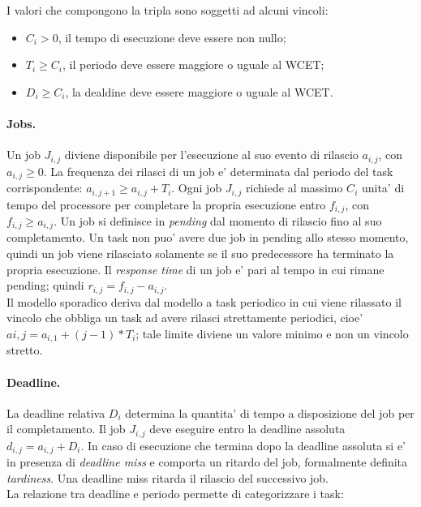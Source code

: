 I valori che compongono la tripla sono soggetti ad alcuni vincoli:\\

\begin{itemize}
	\item $C_i > 0$, il tempo di esecuzione deve essere non nullo;
	\item $T_i \geq C_i$, il periodo deve essere maggiore o uguale al WCET;
	\item $D_i \geq C_i$, la dealdine deve essere maggiore o uguale al WCET.\\
\end{itemize}

\paragraph{Jobs.} Un job $J_{i,j}$ diviene disponibile per l'esecuzione al suo evento di rilascio $a_{i,j}$, con $a_{i,j} \geq 0$. La frequenza dei rilasci di un job e' determinata dal periodo del task corrispondente: $a_{i,j+1} ≥ a_{i,j} + T_i$. Ogni job $J_{i,j}$ richiede al massimo $C_i$ unita' di tempo del processore per completare la propria esecuzione entro $f_{i,j}$, con $f_{i,j} \geq a_{i,j}$. Un job si definisce in \textit{pending} dal momento di rilascio fino al suo completamento. Un task non puo' avere due job in pending allo stesso momento, quindi un job viene rilasciato solamente se il suo predecessore ha terminato la propria esecuzione. Il \textit{response time} di un job e' pari al tempo in cui rimane pending; quindi $r_{i,j} = f_{i,j} − a_{i,j}$.\\
Il modello sporadico deriva dal modello a task periodico in cui viene rilassato il vincolo che obbliga un task ad avere rilasci strettamente periodici, cioe' $ai,j = a_{i,1} + (j − 1) * T_i$; tale limite diviene un valore minimo e non un vincolo stretto.

\paragraph{Deadline.} La deadline relativa $D_i$ determina la quantita' di tempo a disposizione del job per il completamento. Il job $J_{i,j}$ deve eseguire entro la deadline assoluta $d_{i,j} = a_{i,j} + D_i$. In caso di esecuzione che termina dopo la deadline assoluta si e' in presenza di \textit{deadline miss} e comporta un ritardo del job, formalmente definita \textit{tardiness}. Una deadline miss ritarda il rilascio del successivo job.\\
La relazione tra deadline e periodo permette di categorizzare i task:

